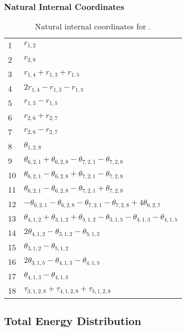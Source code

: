\documentclass[10pt,oneside]{article}
\begin{document}
\begin{table}[h!]
\subsubsection*{Natural Internal Coordinates}
\centering
\caption{Natural internal coordinates for .}
\small
\begin{tabular}{ll}
\toprule
  1   & $r_{1,2}$ \\
  2   & $r_{2,8}$ \\
  3   & $r_{1,4} + r_{1,3} + r_{1,5}$ \\
  4   & $2r_{1,4} - r_{1,3} - r_{1,5}$ \\
  5   & $r_{1,3} - r_{1,5}$ \\
  6   & $r_{2,6} + r_{2,7}$ \\
  7   & $r_{2,6} - r_{2,7}$ \\
  8   & $\theta_{1,2,8}$ \\
  9   & $\theta_{6,2,1} + \theta_{6,2,8} - \theta_{7,2,1} - \theta_{7,2,8}$ \\
  10  & $\theta_{6,2,1} - \theta_{6,2,8} + \theta_{7,2,1} - \theta_{7,2,8}$ \\
  11  & $\theta_{6,2,1} - \theta_{6,2,8} - \theta_{7,2,1} + \theta_{7,2,8}$ \\
  12  & $-\theta_{6,2,1} - \theta_{6,2,8} - \theta_{7,2,1} - \theta_{7,2,8} + 4\theta_{6,2,7}$ \\
  13  & $\theta_{4,1,2} + \theta_{3,1,2} + \theta_{5,1,2} - \theta_{3,1,5} - \theta_{4,1,3} - \theta_{4,1,5}$ \\
  14  & $2\theta_{4,1,2} - \theta_{3,1,2} - \theta_{5,1,2}$ \\
  15  & $\theta_{3,1,2} - \theta_{5,1,2}$ \\
  16  & $2\theta_{3,1,5} - \theta_{4,1,3} - \theta_{4,1,5}$ \\
  17  & $\theta_{4,1,3} - \theta_{4,1,5}$ \\
  18  & $\tau_{3,1,2,8} + \tau_{4,1,2,8} + \tau_{5,1,2,8}$ \\
\bottomrule
\end{tabular}
\end{table}

\begin{table}
\subsection*{Total Energy Distribution}
\centering\end{table}
\end{document}
